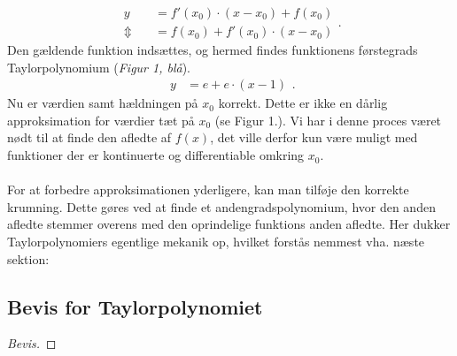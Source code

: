 \documentclass[12pt, a4paper]{article}
\begin{document}
\begin{refsection}
\[\begin{aligned}
    y&=f'(x_0) \cdot (x-x_0)+f(x_0)\\
    \Updownarrow\quad &=f(x_0)+f'(x_0) \cdot (x-x_0)
\end{aligned}
.\] 
Den gældende funktion indsættes, og hermed findes funktionens førstegrads Taylorpolynomium  (\textit{Figur 1, blå}).
\[
\begin{aligned}
    y&=e+e\cdot (x-1)
\end{aligned}
.\] 
Nu er værdien samt hældningen på $x_0$ korrekt. Dette er ikke en dårlig approksimation for værdier tæt på $x_0$ (se Figur 1.). Vi har i denne proces været nødt til at finde den afledte af $f(x)$, det ville derfor kun være muligt med funktioner der er kontinuerte og differentiable omkring $x_0$. \\
\\
For at forbedre approksimationen yderligere, kan man tilføje den korrekte krumning. Dette gøres ved at finde et andengradspolynomium, hvor den anden afledte stemmer overens med den oprindelige funktions anden afledte. Her dukker Taylorpolynomiers egentlige mekanik op, hvilket forstås nemmest vha. næste sektion:

\subsection{Bevis for Taylorpolynomiet}
\begin{proof}[Bevis]
    

\end{proof}
\end{refsection}
\end{document}
